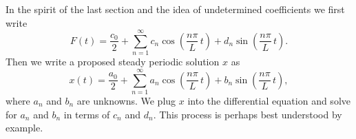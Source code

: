 In the spirit of the last section and the idea of undetermined coefficients
we first write
\begin{equation*}
F(t) = \frac{c_0}{2} + \sum_{n=1}^\infty
c_n \cos \left( \frac{n \pi}{L}\, t \right) +
d_n \sin \left( \frac{n \pi}{L}\, t \right) .
\end{equation*}
Then we write a proposed steady periodic solution $x$ as
\begin{equation*}
x(t) = \frac{a_0}{2} + \sum_{n=1}^\infty
a_n \cos \left( \frac{n \pi}{L}\, t \right) +
b_n \sin \left( \frac{n \pi}{L}\, t \right) ,
\end{equation*}
where $a_n$ and $b_n$ are unknowns.
We plug $x$ into the differential equation and solve for $a_n$ and
$b_n$ in terms of $c_n$ and $d_n$.  This process
is perhaps best understood by example.
\pagebreak[2]

